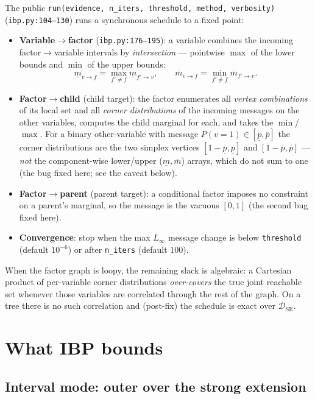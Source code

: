 \documentclass[11pt]{article}
\newcommand{\lo}{\underline}
\newcommand{\hi}{\overline}
\newcommand{\DSE}{\mathcal{D}_{\mathrm{SE}}}
\begin{document}
The public \texttt{run(evidence, n\_iters, threshold, method, verbosity)} (\texttt{ibp.py:104--130})
runs a synchronous schedule to a fixed point:
\begin{itemize}
  \item \textbf{Variable$\to$factor} (\texttt{ibp.py:176--195}): a variable combines the incoming
    factor$\to$variable intervals by \emph{intersection} --- pointwise $\max$ of the lower bounds
    and $\min$ of the upper bounds:
    \[
      \lo m_{v\to f}=\max_{f'\neq f}\lo m_{f'\to v},\qquad
      \hi m_{v\to f}=\min_{f'\neq f}\hi m_{f'\to v}.
    \]
  \item \textbf{Factor$\to$child} (child target): the factor enumerates all \emph{vertex
    combinations} of its local set and all \emph{corner distributions} of the incoming messages on
    the other variables, computes the child marginal for each, and takes the $\min$/$\max$. For a
    binary other-variable with message $P(v{=}1)\in[\lo p,\hi p]$ the corner distributions are the
    two simplex vertices $[1{-}\lo p,\lo p]$ and $[1{-}\hi p,\hi p]$ --- \emph{not} the component-wise
    lower/upper ($\lo{m},\hi{m}$) arrays, which do not sum to one (the bug fixed here; see the caveat below).
  \item \textbf{Factor$\to$parent} (parent target): a conditional factor imposes no constraint on a
    parent's marginal, so the message is the vacuous $[0,1]$ (the second bug fixed here).
  \item \textbf{Convergence}: stop when the max $L_\infty$ message change is below \texttt{threshold}
    (default $10^{-6}$) or after \texttt{n\_iters} (default $100$).
\end{itemize}
When the factor graph is loopy, the remaining slack is algebraic: a Cartesian product of per-variable
corner distributions \emph{over-covers} the true joint reachable set whenever those variables are
correlated through the rest of the graph. On a tree there is no such correlation and (post-fix) the
schedule is exact over $\DSE$.

\section{What IBP bounds}\label{sec:bounds}

\subsection{Interval mode: outer over the strong extension}
\end{document}
